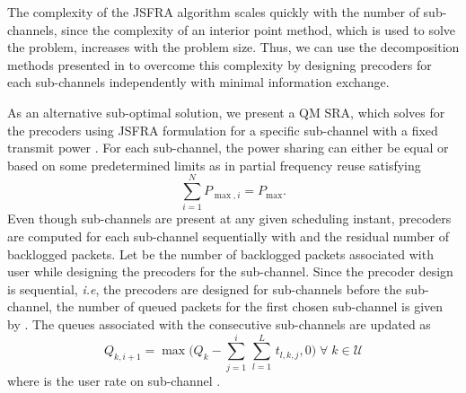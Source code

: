 The complexity of the \ac{JSFRA} algorithm scales quickly with the number of sub-channels, since the complexity of an interior point method, which is used to solve the problem, increases with the problem size. Thus, we can use the decomposition methods presented in \cite{palomar2006tutorial,boyd2011distributed} to overcome this complexity by designing precoders for each sub-channels independently with minimal information exchange.

As an alternative sub-optimal solution, we present a \acl{QM} \ac{SRA}, which solves for the precoders using \ac{JSFRA} formulation for a specific sub-channel  with a fixed transmit power . For each sub-channel, the power sharing can either be equal or based on some predetermined limits as in partial frequency reuse satisfying
\begin{equation}
\sum_{i=1}^N P_{\max,i} = P_{\max}.
\end{equation}
Even though  sub-channels are present at any given scheduling instant, precoders are computed for each sub-channel sequentially with  and the residual number of backlogged packets. Let  be the number of backlogged packets associated with user  while designing the precoders for the  sub-channel. Since the precoder design is sequential, \textit{i.e}, the precoders are designed for sub-channels \me{[0,i-1]} before the  sub-channel, the number of queued packets for the first chosen sub-channel is given by . The queues associated with the consecutive sub-channels are updated as
\begin{equation}	\label{eqn-weight}
Q_{k,i+1} = \max \Big ( Q_k - \sum_{j = 1}^{i} \, \sum_{l = 1}^{L} \, t_{l,k,j} ,0 \Big ) \; \forall \; k \in \mathcal{U}
\end{equation}
where  is the  user rate on sub-channel . 


